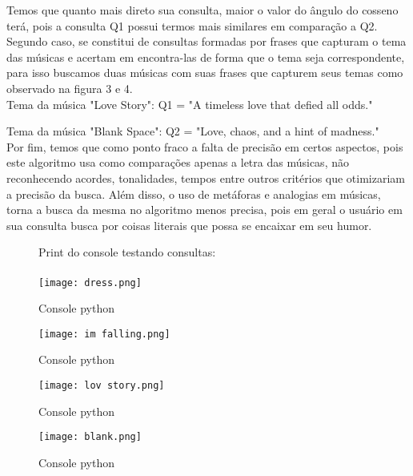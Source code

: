 \documentclass[a4paper,12pt]{article}
\begin{document}
Temos que quanto mais direto sua consulta, maior o valor do ângulo do cosseno terá, pois a consulta Q1 possui termos mais similares em comparação a Q2.\\

Segundo caso, se constitui de consultas formadas por frases que capturam o tema das músicas e acertam em encontra-las de forma que o tema seja correspondente, para isso buscamos duas músicas com suas frases que capturem seus temas como observado na figura 3 e 4.\\

Tema da música "Love Story": Q1 = "A timeless love that defied all odds."

Tema da música "Blank Space": Q2 = "Love, chaos, and a hint of madness."\\

Por fim, temos que como ponto fraco a falta de precisão em certos aspectos, pois este algoritmo usa como comparações apenas a letra das músicas, não reconhecendo acordes, tonalidades, tempos entre outros critérios que otimizariam a precisão da busca. Além disso, o uso de metáforas e analogias em músicas, torna a busca da mesma no algoritmo menos precisa, pois em geral o usuário em sua consulta busca por coisas literais que possa se encaixar em seu humor.




\begin{figure}
Print do console testando consultas:\\\\
    \centering
    \texttt{[image: dress.png]}
    \caption{Console python}
    \label{fig:enter-label}
    \texttt{[image: im falling.png]}
    \caption{Console python}
    \label{fig:enter-label}
    \centering
    \texttt{[image: lov story.png]}
    \caption{Console python}
    \label{fig:enter-label}
        \texttt{[image: blank.png]}
    \caption{Console python}
    \label{fig:enter-label}
\end{figure}    
 
\end{document}
